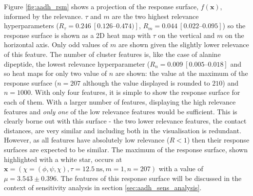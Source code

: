Figure \ref{fig:aadh_rsm} shows a projection of the response surface, $f(\mathbf{x})$, informed by the relevance. $\tau$ and $m$ are the two highest relevance hyperparameters ($R_{\tau} = \num{0.246}\ [\numrange[range-phrase=-]{0.126}{0.474})]$, $R_{m} = \num{0.044}\ [\numrange[range-phrase=-]{0.022}{0.095}]$) so the response surface is shown as a 2D heat map with $\tau$ on the vertical and $m$ on the horizontal axis. Only odd values of $m$ are shown given the slightly lower relevance of this feature. The number of cluster features is, like the case of alanine dipeptide, the lowest relevance hyperparameter ($R_{n} = \num{0.009}\ [\numrange[range-phrase=-]{0.005}{0.018}]$ and so heat maps for only two value of $n$ are shown: the value at the maximum of the response surface ($n=207$ although the value displayed is rounded to $210$) and $n=1000$. With only four features, it is  simple to show the response surface for each of them. With a larger number of features, displaying the high relevance features and \emph{only one} of the low relevance features would be sufficient. This is clearly borne out with this surface - the two lower relevance features, the contact distances, are very similar and including both in the visualisation is redundant. However, as all features have absolutely low relevance ($R<1$) then their response surfaces are expected to be similar. The maximum of the response surface, shown highlighted with a  white star, occurs at $\mathbf{x}=\left(\chi=(\phi, \psi, \chi), \tau = \SI{12.5}{\nano\second}, m=1, n=207\right)$ with a value of $\mu=3.543 \pm 0.396$. The features of this response surface will be discussed in the context of sensitivity analysis in section \ref{sec:aadh_sens_analysis}. 

